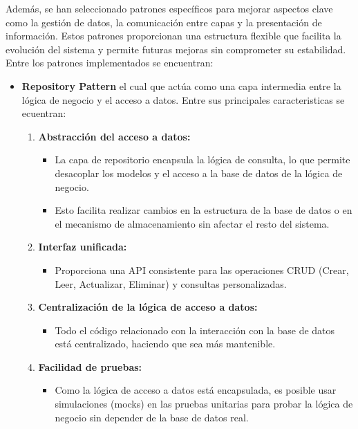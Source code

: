 \documentclass{report}
\begin{document}
    Además, se han seleccionado patrones específicos para mejorar aspectos clave como la gestión de datos, la comunicación entre capas y la presentación de información. 
    Estos patrones proporcionan una estructura flexible que facilita la evolución del sistema y permite futuras mejoras sin comprometer su estabilidad. \\

    Entre los patrones implementados se encuentran:

    \begin{itemize}
        \item \textbf{Repository Pattern} el cual que actúa como una capa intermedia entre la lógica de negocio y el acceso a datos. Entre sus principales caracteristicas se ecuentran:
        \begin{enumerate}
            \item \textbf{Abstracción del acceso a datos:}
            \begin{itemize}
                \item La capa de repositorio encapsula la lógica de consulta, lo que permite desacoplar los modelos y el acceso a la base de datos de la lógica de negocio.
                \item Esto facilita realizar cambios en la estructura de la base de datos o en el mecanismo de almacenamiento sin afectar el resto del sistema.
            \end{itemize}

            \item \textbf{Interfaz unificada:}
            \begin{itemize}
                \item Proporciona una API consistente para las operaciones CRUD (Crear, Leer, Actualizar, Eliminar) y consultas personalizadas.
            \end{itemize}

            \item \textbf{Centralización de la lógica de acceso a datos:}
            \begin{itemize}
                \item Todo el código relacionado con la interacción con la base de datos está centralizado, haciendo que sea más mantenible.
            \end{itemize}

            \item \textbf{Facilidad de pruebas:}
            \begin{itemize}
                \item Como la lógica de acceso a datos está encapsulada, es posible usar simulaciones (mocks) en las pruebas unitarias para probar la lógica de negocio sin depender de la base de datos real.
            \end{itemize}
        \end{enumerate}


\end{itemize}
\end{document}
